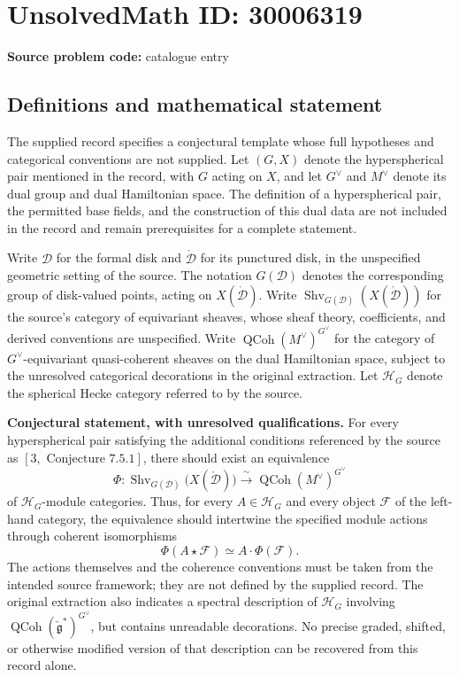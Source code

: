 \documentclass[11pt]{article}
\begin{document}
\section*{UnsolvedMath ID: 30006319}
\textbf{Source problem code:} catalogue entry
\subsection{Definitions and mathematical statement}
The supplied record specifies a conjectural template whose full hypotheses and categorical conventions are not supplied. Let \((G,X)\) denote the hyperspherical pair mentioned in the record, with \(G\) acting on \(X\), and let \(G^\vee\) and \(M^\vee\) denote its dual group and dual Hamiltonian space. The definition of a hyperspherical pair, the permitted base fields, and the construction of this dual data are not included in the record and remain prerequisites for a complete statement.

Write \(\mathcal D\) for the formal disk and \(\mathring{\mathcal D}\) for its punctured disk, in the unspecified geometric setting of the source. The notation \(G(\mathcal D)\) denotes the corresponding group of disk-valued points, acting on \(X(\mathring{\mathcal D})\). Write \(\operatorname{Shv}_{G(\mathcal D)}(X(\mathring{\mathcal D}))\) for the source's category of equivariant sheaves, whose sheaf theory, coefficients, and derived conventions are unspecified. Write \(\operatorname{QCoh}(M^\vee)^{G^\vee}\) for the category of \(G^\vee\)-equivariant quasi-coherent sheaves on the dual Hamiltonian space, subject to the unresolved categorical decorations in the original extraction. Let \(\mathcal H_G\) denote the spherical Hecke category referred to by the source.

\textbf{Conjectural statement, with unresolved qualifications.} For every hyperspherical pair satisfying the additional conditions referenced by the source as \([3,\text{ Conjecture }7.5.1]\), there should exist an equivalence
\[
\Phi:\operatorname{Shv}_{G(\mathcal D)}\!\bigl(X(\mathring{\mathcal D})\bigr)
\xrightarrow{\ \sim\ }
\operatorname{QCoh}(M^\vee)^{G^\vee}
\]
of \(\mathcal H_G\)-module categories. Thus, for every \(A\in\mathcal H_G\) and every object \(\mathcal F\) of the left-hand category, the equivalence should intertwine the specified module actions through coherent isomorphisms
\[
\Phi(A\star\mathcal F)\simeq A\cdot\Phi(\mathcal F).
\]
The actions themselves and the coherence conventions must be taken from the intended source framework; they are not defined by the supplied record. The original extraction also indicates a spectral description of \(\mathcal H_G\) involving \(\operatorname{QCoh}(\check{\mathfrak g}^{*})^{G^\vee}\), but contains unreadable decorations. No precise graded, shifted, or otherwise modified version of that description can be recovered from this record alone.
\end{document}
